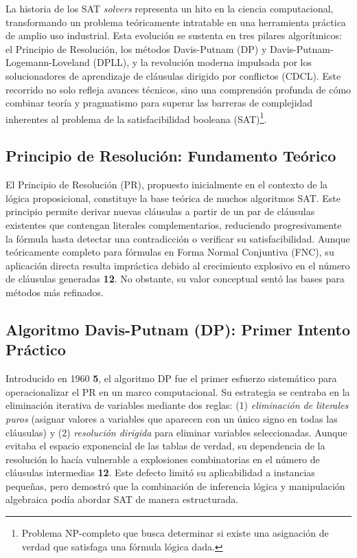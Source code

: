 La historia de los SAT \textit{solvers} representa un hito en la ciencia computacional, transformando un problema teóricamente intratable en una herramienta práctica de amplio uso industrial. Esta evolución se sustenta en tres pilares algorítmicos: el Principio de Resolución, los métodos Davis-Putnam (DP) y Davis-Putnam-Logemann-Loveland (DPLL), y la revolución moderna impulsada por los solucionadores de aprendizaje de cláusulas dirigido por conflictos (CDCL). Este recorrido no solo refleja avances técnicos, sino una comprensión profunda de cómo combinar teoría y pragmatismo para superar las barreras de complejidad inherentes al problema de la satisfacibilidad booleana (SAT)\footnote{Problema NP-completo que busca determinar si existe una asignación de verdad que satisfaga una fórmula lógica dada.}.

\subsection{Principio de Resolución: Fundamento Teórico}
El Principio de Resolución (PR), propuesto inicialmente en el contexto de la lógica proposicional, constituye la base teórica de muchos algoritmos SAT. Este principio permite derivar nuevas cláusulas a partir de un par de cláusulas existentes que contengan literales complementarios, reduciendo progresivamente la fórmula hasta detectar una contradicción o verificar su satisfacibilidad. Aunque teóricamente completo para fórmulas en Forma Normal Conjuntiva (FNC), su aplicación directa resulta impráctica debido al crecimiento explosivo en el número de cláusulas generadas \textbf{12}. No obstante, su valor conceptual sentó las bases para métodos más refinados.

\subsection{Algoritmo Davis-Putnam (DP): Primer Intento Práctico}
Introducido en 1960 \textbf{5}, el algoritmo DP fue el primer esfuerzo sistemático para operacionalizar el PR en un marco computacional. Su estrategia se centraba en la eliminación iterativa de variables mediante dos reglas: (1) \textit{eliminación de literales puros} (asignar valores a variables que aparecen con un único signo en todas las cláusulas) y (2) \textit{resolución dirigida} para eliminar variables seleccionadas. Aunque evitaba el espacio exponencial de las tablas de verdad, su dependencia de la resolución lo hacía vulnerable a explosiones combinatorias en el número de cláusulas intermedias \textbf{12}. Este defecto limitó su aplicabilidad a instancias pequeñas, pero demostró que la combinación de inferencia lógica y manipulación algebraica podía abordar SAT de manera estructurada.

